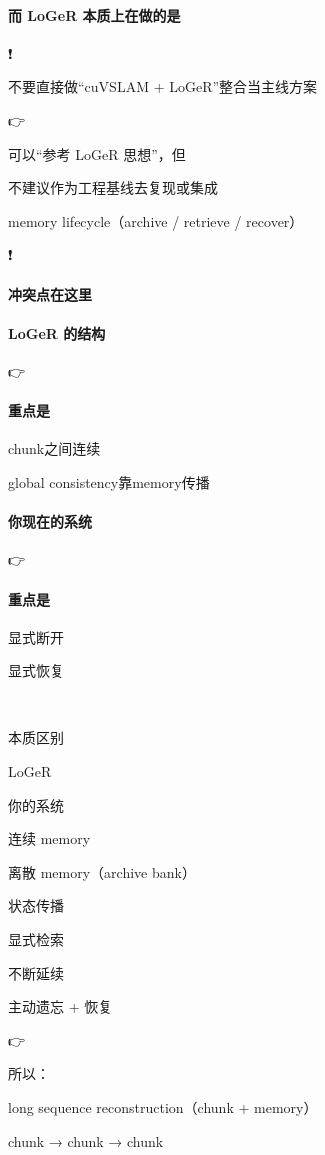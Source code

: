 \documentclass[12pt]{article}
\begin{document}
\paragraph{而 LoGeR 本质上在做的是}
❗

不要直接做“cuVSLAM + LoGeR”整合当主线方案

👉

可以“参考 LoGeR 思想”，但

不建议作为工程基线去复现或集成

memory lifecycle（archive / retrieve / recover）

❗

\paragraph{冲突点在这里}
\paragraph{LoGeR 的结构}
👉

\paragraph{重点是}
chunk之间连续

global consistency靠memory传播

\paragraph{你现在的系统}
👉

\paragraph{重点是}
显式断开

显式恢复

🔴

本质区别

LoGeR

你的系统

连续 memory

离散 memory（archive bank）

状态传播

显式检索

不断延续

主动遗忘 + 恢复

👉

所以：

long sequence reconstruction（chunk + memory）

chunk → chunk → chunk
\end{document}
